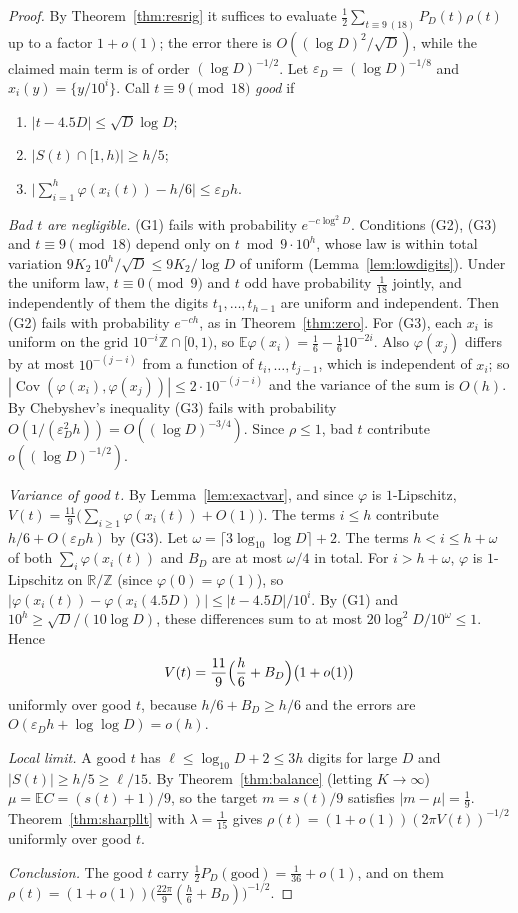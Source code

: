 \documentclass[11pt]{article}
\theoremstyle{definition}
\theoremstyle{remark}
\begin{document}
\begin{proof}
By Theorem~\ref{thm:resrig} it suffices to evaluate
$\frac12\sum_{t\equiv9\,(18)}P_D(t)\rho(t)$ up to a factor $1+o(1)$; the error
there is $O((\log D)^2/\sqrt D)$, while the claimed main term is of order
$(\log D)^{-1/2}$. Let $\varepsilon_D=(\log D)^{-1/8}$ and
$x_i(y)=\{y/10^i\}$. Call $t\equiv9\pmod{18}$ \emph{good} if
\begin{enumerate}
\item[(G1)] $|t-4.5D|\le\sqrt D\log D$;
\item[(G2)] $|S(t)\cap[1,h)|\ge h/5$;
\item[(G3)] $\bigl|\sum_{i=1}^h\varphi(x_i(t))-h/6\bigr|\le\varepsilon_Dh$.
\end{enumerate}
\emph{Bad $t$ are negligible.} (G1) fails with probability
$e^{-c\log^2D}$. Conditions (G2), (G3) and $t\equiv9\pmod{18}$ depend only
on $t\bmod9\cdot10^h$, whose law is within total variation
$9K_2\,10^h/\sqrt D\le9K_2/\log D$ of uniform (Lemma~\ref{lem:lowdigits}).
Under the uniform law, $t\equiv0\pmod9$ and $t$ odd have probability
$\frac1{18}$ jointly, and independently of them the digits $t_1,\dots,t_{h-1}$
are uniform and independent. Then (G2) fails with probability $e^{-ch}$, as
in Theorem~\ref{thm:zero}. For (G3), each $x_i$ is uniform on the grid
$10^{-i}\mathbb Z\cap[0,1)$, so $\mathbb E\varphi(x_i)=\frac16-\frac1{6}10^{-2i}$.
Also $\varphi(x_j)$ differs by at most $10^{-(j-i)}$ from a function of
$t_{i},\dots,t_{j-1}$, which is independent of $x_i$; so
$|\operatorname{Cov}(\varphi(x_i),\varphi(x_j))|\le2\cdot10^{-(j-i)}$ and the
variance of the sum is $O(h)$. By Chebyshev's inequality (G3) fails with
probability $O(1/(\varepsilon_D^2h))=O((\log D)^{-3/4})$. Since $\rho\le1$, bad
$t$ contribute $o((\log D)^{-1/2})$.

\emph{Variance of good $t$.} By Lemma~\ref{lem:exactvar}, and since $\varphi$
is $1$-Lipschitz, $V(t)=\frac{11}9\bigl(\sum_{i\ge1}\varphi(x_i(t))+O(1)\bigr)$.
The terms $i\le h$ contribute $h/6+O(\varepsilon_Dh)$ by (G3). Let
$\omega=\lceil3\log_{10}\log D\rceil+2$. The terms $h<i\le h+\omega$ of both
$\sum_i\varphi(x_i(t))$ and $B_D$ are at most $\omega/4$ in total. For $i>h+\omega$,
$\varphi$ is $1$-Lipschitz on $\mathbb R/\mathbb Z$ (since $\varphi(0)=\varphi(1)$), so
$|\varphi(x_i(t))-\varphi(x_i(4.5D))|\le|t-4.5D|/10^i$. By (G1) and
$10^h\ge\sqrt D/(10\log D)$, these differences sum to at most
$20\log^2D/10^{\omega}\le1$. Hence
\[
  V(t)=\frac{11}9\Bigl(\frac h6+B_D\Bigr)\bigl(1+o(1)\bigr)
\]
uniformly over good $t$, because $h/6+B_D\ge h/6$ and the errors are
$O(\varepsilon_Dh+\log\log D)=o(h)$.

\emph{Local limit.} A good $t$ has $\ell\le\log_{10}D+2\le3h$ digits for large
$D$ and $|S(t)|\ge h/5\ge\ell/15$. By Theorem~\ref{thm:balance} (letting
$K\to\infty$) $\mu=\mathbb EC=(s(t)+1)/9$, so the target $m=s(t)/9$ satisfies
$|m-\mu|=\frac19$. Theorem~\ref{thm:sharpllt} with $\lambda=\frac1{15}$ gives
$\rho(t)=(1+o(1))(2\pi V(t))^{-1/2}$ uniformly over good $t$.

\emph{Conclusion.} The good $t$ carry
$\frac12P_D(\text{good})=\frac1{36}+o(1)$, and on them
$\rho(t)=(1+o(1))\bigl(\frac{22\pi}9(\frac h6+B_D)\bigr)^{-1/2}$.
\end{proof}
\end{document}
